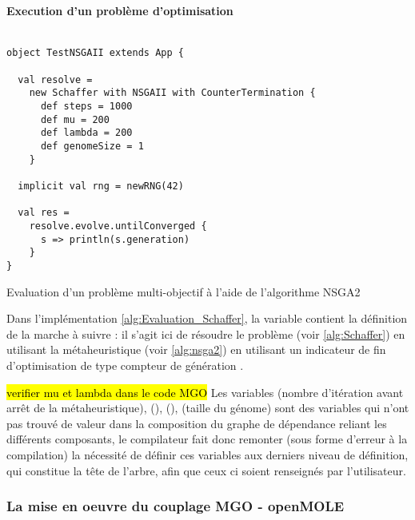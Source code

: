 
\paragraph{Execution d'un problème d'optimisation}

\begin{listing}[H]

\begin{verbatim}

object TestNSGAII extends App {

  val resolve =
    new Schaffer with NSGAII with CounterTermination {
      def steps = 1000
      def mu = 200
      def lambda = 200
      def genomeSize = 1
    }

  implicit val rng = newRNG(42)

  val res =
    resolve.evolve.untilConverged {
      s => println(s.generation)
    }
}

\end{verbatim}
\caption{Evaluation d'un problème multi-objectif à l'aide de l'algorithme NSGA2}
\label{alg:Evaluation_Schaffer}
\end{listing}

Dans l'implémentation \ref{alg:Evaluation_Schaffer}, la variable   contient la définition de la marche à suivre : il s'agit ici de résoudre le problème  (voir \ref{alg:Schaffer}) en utilisant la métaheuristique  (voir \ref{alg:nsga2}) en utilisant un indicateur de fin d'optimisation de type compteur de génération . 

\hl{verifier mu et lambda dans le code MGO}
Les variables  (nombre d'itération avant arrêt de la métaheuristique),  (),  (),  (taille du génome) sont des variables qui n'ont pas trouvé de valeur dans la composition du graphe de dépendance reliant les différents composants, le compilateur fait donc remonter (sous forme d'erreur à la compilation) la nécessité de définir ces variables aux derniers niveau de définition, qui constitue la tête de l'arbre, afin que ceux ci soient renseignés par l'utilisateur.


\subsubsection{La mise en oeuvre du couplage MGO - openMOLE }

